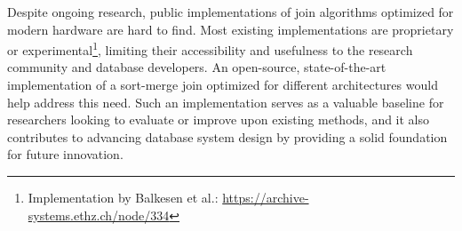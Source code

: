 Despite ongoing research, public implementations of join algorithms optimized for modern hardware
are hard to find. Most existing implementations are proprietary or 
experimental\footnote{Implementation by Balkesen et al.: \url{https://archive-systems.ethz.ch/node/334}}, limiting their
accessibility and usefulness to the research community and database developers. An open-source,
state-of-the-art implementation of a sort-merge join optimized for different architectures would
help address this need. Such an implementation serves as a valuable baseline for researchers
looking to evaluate or improve upon existing methods, and it also contributes to advancing database
system design by providing a solid foundation for future innovation.



